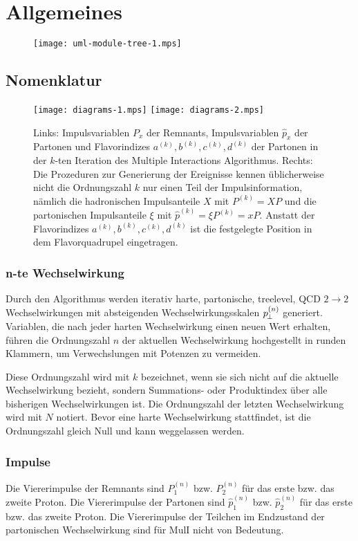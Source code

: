 \part{Allgemeines}
\begin{figure}
  \texttt{[image: uml-module-tree-1.mps]}
\end{figure}
\chapter{Nomenklatur}
\begin{figure}
  \texttt{[image: diagrams-1.mps]}
  \texttt{[image: diagrams-2.mps]}
  \caption{\label{fig:nomen:had}Links: Impulsvariablen $P_x$ der Remnants, Impulsvariablen $\hat{p}_x$ der Partonen und Flavorindizes $a^{(k)},b^{(k)},c^{(k)},d^{(k)}$ der Partonen in der $k$-ten Iteration des Multiple Interactions Algorithmus. Rechts: Die Prozeduren zur Generierung der Ereignisse kennen üblicherweise nicht die Ordnungszahl $k$ nur einen Teil der Impulsinformation, nämlich die hadronischen Impulsanteile $X$ mit $P^{(k)}=XP$ und die partonischen Impulsanteile $\xi$ mit $\hat{p}^{(k)}=\xi P^{(k)}=x P$. Anstatt der Flavorindizes $a^{(k)},b^{(k)},c^{(k)},d^{(k)}$ ist die festgelegte Position in dem Flavorquadrupel eingetragen.}
\end{figure}
\section{n-te Wechselwirkung}
Durch den Algorithmus werden iterativ harte, partonische, treelevel, QCD $2\rightarrow 2$ Wechselwirkungen mit absteigenden Wechselwirkungsskalen $p_{\!\perp}^{(n)}$ generiert. Variablen, die nach jeder harten Wechselwirkung einen neuen Wert erhalten, führen die Ordnungszahl $n$ der aktuellen Wechselwirkung hochgestellt in runden Klammern, um Verwechslungen mit Potenzen zu vermeiden.

Diese Ordnungszahl wird mit $k$ bezeichnet, wenn sie sich nicht auf die aktuelle Wechselwirkung bezieht, sondern Summations- oder Produktindex über alle bisherigen Wechselwirkungen ist. Die Ordnungszahl der letzten Wechselwirkung wird mit $N$ notiert. Bevor eine harte Wechselwirkung stattfindet, ist die Ordnungszahl gleich Null und kann weggelassen werden.
\section{Impulse}
Die Viererimpulse der Remnants sind $P_1^{(n)}$ bzw. $P_2^{(n)}$ für das erste bzw. das zweite Proton. Die Viererimpulse der Partonen sind $\hat{p}_1^{(n)}$ bzw. $\hat{p}_2^{(n)}$ für das erste bzw. das zweite Proton. Die Viererimpulse der Teilchen im Endzustand der partonischen Wechselwirkung sind für MulI nicht von Bedeutung.

